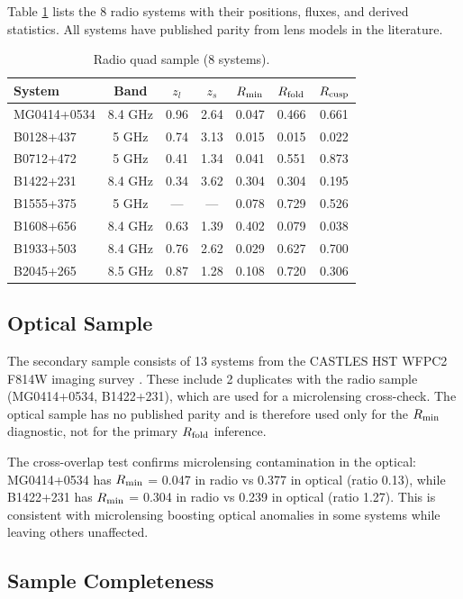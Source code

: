 \documentclass[12pt]{article}
\newcommand{\rfold}{\ensuremath{R_{\rm fold}}}
\newcommand{\rcusp}{\ensuremath{R_{\rm cusp}}}
\newcommand{\rmin}{\ensuremath{R_{\rm min}}}
\begin{document}
Table \ref{tab:radio} lists the 8 radio systems with their positions, fluxes,
and derived statistics. All systems have published parity from lens models
in the literature.

\begin{table}
\centering
\caption{Radio quad sample (8 systems).}
\label{tab:radio}
\begin{tabular}{lcccccc}
\hline
System & Band & $z_l$ & $z_s$ & \rmin{} & \rfold{} & \rcusp{} \\
\hline
MG0414+0534 & 8.4 GHz & 0.96 & 2.64 & 0.047 & 0.466 & 0.661 \\
B0128+437   & 5 GHz   & 0.74 & 3.13 & 0.015 & 0.015 & 0.022 \\
B0712+472   & 5 GHz   & 0.41 & 1.34 & 0.041 & 0.551 & 0.873 \\
B1422+231   & 8.4 GHz & 0.34 & 3.62 & 0.304 & 0.304 & 0.195 \\
B1555+375   & 5 GHz   & --- & ---  & 0.078 & 0.729 & 0.526 \\
B1608+656   & 8.4 GHz & 0.63 & 1.39 & 0.402 & 0.079 & 0.038 \\
B1933+503   & 8.4 GHz & 0.76 & 2.62 & 0.029 & 0.627 & 0.700 \\
B2045+265   & 8.5 GHz & 0.87 & 1.28 & 0.108 & 0.720 & 0.306 \\
\hline
\end{tabular}
\end{table}

\clearpage
\subsection{Optical Sample}
\label{sec:optical}

The secondary sample consists of 13 systems from the CASTLES HST WFPC2 F814W
imaging survey \cite{CASTLES}. These include 2 duplicates with the radio sample
(MG0414+0534, B1422+231), which are used for a microlensing cross-check.
The optical sample has no published parity and is therefore used only for the
\rmin{} diagnostic, not for the primary \rfold{} inference.

The cross-overlap test confirms microlensing contamination in the optical:
MG0414+0534 has \rmin{} = 0.047 in radio vs 0.377 in optical (ratio 0.13),
while B1422+231 has \rmin{} = 0.304 in radio vs 0.239 in optical (ratio 1.27).
This is consistent with microlensing boosting optical anomalies in some systems
while leaving others unaffected.

\subsection{Sample Completeness}
\label{sec:completeness}
\end{document}
